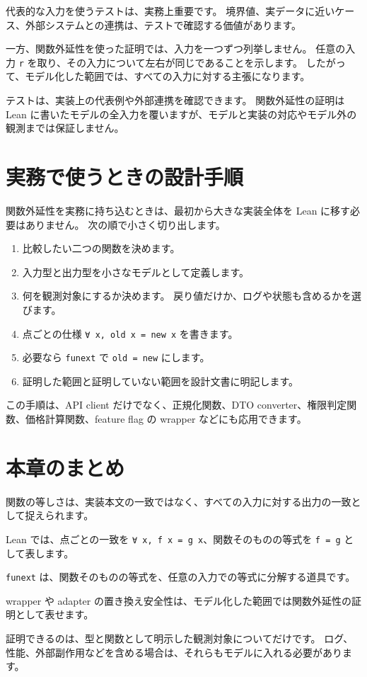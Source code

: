 代表的な入力を使うテストは、実務上重要です。
境界値、実データに近いケース、外部システムとの連携は、テストで確認する価値があります。

一方、関数外延性を使った証明では、入力を一つずつ列挙しません。
任意の入力 \texttt{r} を取り、その入力について左右が同じであることを示します。
したがって、モデル化した範囲では、すべての入力に対する主張になります。

テストは、実装上の代表例や外部連携を確認できます。
関数外延性の証明は Lean に書いたモデルの全入力を覆いますが、モデルと実装の対応やモデル外の観測までは保証しません。

\section{実務で使うときの設計手順}

関数外延性を実務に持ち込むときは、最初から大きな実装全体を Lean に移す必要はありません。
次の順で小さく切り出します。

\begin{enumerate}
\item 比較したい二つの関数を決めます。
\item 入力型と出力型を小さなモデルとして定義します。
\item 何を観測対象にするか決めます。
戻り値だけか、ログや状態も含めるかを選びます。
\item 点ごとの仕様 \texttt{∀ x, old x = new x} を書きます。
\item 必要なら \texttt{funext} で \texttt{old = new} にします。
\item 証明した範囲と証明していない範囲を設計文書に明記します。
\end{enumerate}

この手順は、API client だけでなく、正規化関数、DTO converter、権限判定関数、価格計算関数、feature flag の wrapper などにも応用できます。

\section{本章のまとめ}

関数の等しさは、実装本文の一致ではなく、すべての入力に対する出力の一致として捉えられます。

Lean では、点ごとの一致を \texttt{∀ x, f x = g x}、関数そのものの等式を \texttt{f = g} として表します。

\texttt{funext} は、関数そのものの等式を、任意の入力での等式に分解する道具です。

wrapper や adapter の置き換え安全性は、モデル化した範囲では関数外延性の証明として表せます。

証明できるのは、型と関数として明示した観測対象についてだけです。
ログ、性能、外部副作用などを含める場合は、それらもモデルに入れる必要があります。
